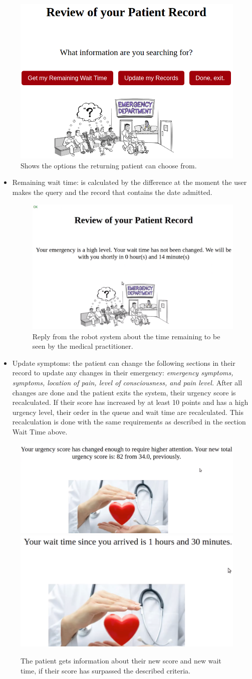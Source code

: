 \documentclass[letterpaper]{article}
\begin{document}
\begin{figure}[H]
  \centering
  \includegraphics[width=.35\textwidth]{ReviewRecordChoose.png}\hfill
   \caption{Shows the options the returning patient can choose from.}
\end{figure}

\begin{itemize}
\item Remaining wait time: is calculated by the difference at the moment the user makes the query and the record that contains the date admitted.


\begin{figure}[H]
  \centering
  \includegraphics[width=.35\textwidth]{RemainWaitTime.png}\hfill
   \caption{Reply from the robot system about the time remaining to be seen by the medical practitioner.}
\end{figure}

\item Update symptoms: the patient can change the following sections in their record to update any changes in their emergency: \textit{emergency symptoms, symptoms, location of pain, level of consciousness, and pain level.} After all changes are done and the patient exits the system, their urgency score is recalculated. If their score has increased by at least 10 points and has a high urgency level, their order in the queue and wait time are recalculated. This recalculation is done with the same requirements as described in the section Wait Time above.

\end{itemize}


\begin{figure}[H]
  \centering
  \includegraphics[width=.35\textwidth]{ChangeUrgencyScore-012.png}\hfill
  \includegraphics[width=.35\textwidth]{ChangeWaitTime-012.png}\hfill 
   \caption{The patient gets information about their new score and new wait time, if their score has surpassed the described criteria.}
\end{figure}
\end{document}
